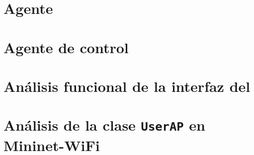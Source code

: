 \section{Agente }
\label{sec:ana_switch}

\section{Agente de control }
\label{sec:ana_controller}

\section{Análisis funcional de la interfaz del }
\label{sec:ana_bofuss}

\section{Análisis de la clase \texttt{UserAP} en Mininet-WiFi}
\label{sec:ana_userap}

